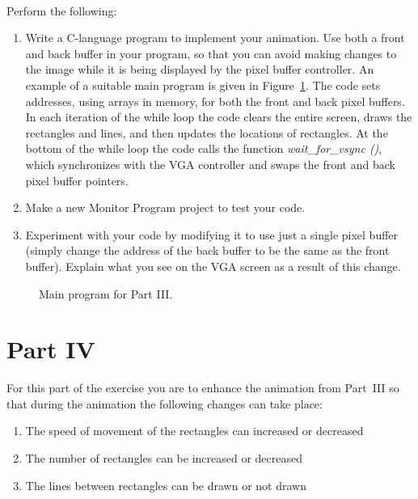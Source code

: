 \documentclass[epsfig,10pt,fullpage]{article}
\begin{document}
~\\
Perform the following:

\begin{enumerate}

\item Write a C-language program to implement your animation. Use both a front and back buffer 
in your program, so that you can avoid making changes to the image while it is being displayed 
by the pixel buffer controller.  An example of a suitable main program is given in 
Figure~\ref{fig:main3}. The code sets addresses, using arrays in memory, for both the front
and back pixel buffers.  In each iteration of
the while loop the code clears the entire screen, draws the rectangles and lines, and then 
updates the locations of rectangles. At the bottom of the while loop the code calls the
function {\it wait\_for\_vsync ()}, which synchronizes with the VGA controller and swaps the 
front and back pixel buffer pointers.

\item Make a new Monitor Program project to test your code.

\item Experiment with your code by modifying it to use just a single pixel buffer (simply
change the address of the back buffer to be the same as the front buffer). Explain what you 
see on the VGA screen as a result of this change.
\end{enumerate}

\begin{figure}[H]
\centering

\caption{Main program for Part III.}
\label{fig:main3}
\end{figure}

\newpage
\section*{Part IV}
For this part of the exercise you are to enhance the animation from Part~III so that
during the animation the following changes can take place:

\begin{enumerate}
\item
The speed of movement of the rectangles can increased or decreased
\item
The number of rectangles can be increased or decreased
\item
The lines between rectangles can be drawn or not drawn
\end{enumerate}
\end{document}

